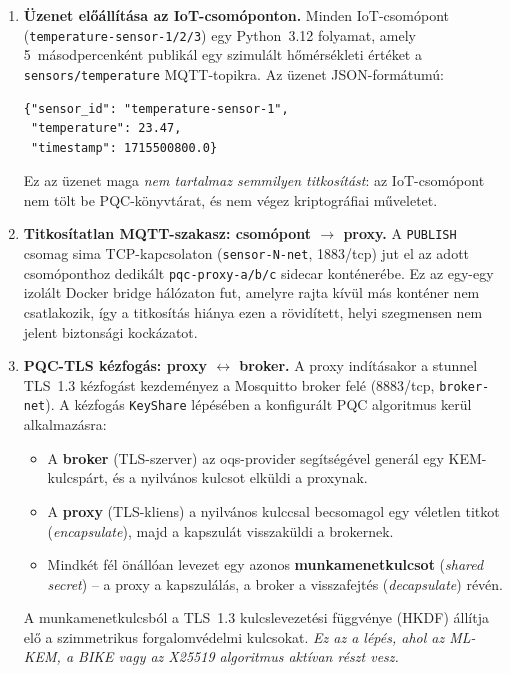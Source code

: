 \begin{enumerate}

    \item \textbf{Üzenet előállítása az IoT-csomóponton.}
    Minden IoT-csomópont (\texttt{temperature-sensor-1/2/3}) egy Python~3.12
    folyamat, amely 5~másodpercenként publikál egy szimulált hőmérsékleti értéket
    a \texttt{sensors/temperature} MQTT-topikra. Az üzenet JSON-formátumú:
\begin{verbatim}
{"sensor_id": "temperature-sensor-1",
 "temperature": 23.47,
 "timestamp": 1715500800.0}
\end{verbatim}
    Ez az üzenet maga \emph{nem tartalmaz semmilyen titkosítást}: az IoT-csomópont
    nem tölt be PQC-könyvtárat, és nem végez kriptográfiai műveletet.

    \item \textbf{Titkosítatlan MQTT-szakasz: csomópont $\to$ proxy.}
    A \texttt{PUBLISH} csomag sima TCP-kapcsolaton (\texttt{sensor-N-net}, 1883/tcp)
    jut el az adott csomóponthoz dedikált \texttt{pqc-proxy-a/b/c} sidecar
    konténerébe. Ez az egy-egy izolált Docker bridge hálózaton fut, amelyre rajta
    kívül más konténer nem csatlakozik, így a titkosítás hiánya ezen a rövidített,
    helyi szegmensen nem jelent biztonsági kockázatot.

    \item \textbf{PQC-TLS kézfogás: proxy $\leftrightarrow$ broker.}
    A proxy indításakor a stunnel TLS~1.3 kézfogást kezdeményez a Mosquitto broker
    felé (8883/tcp, \texttt{broker-net}). A kézfogás \texttt{KeyShare} lépésében a
    konfigurált PQC algoritmus kerül alkalmazásra:
    \begin{itemize}
        \item A \textbf{broker} (TLS-szerver) az oqs-provider segítségével generál
              egy KEM-kulcspárt, és a nyilvános kulcsot elküldi a proxynak.
        \item A \textbf{proxy} (TLS-kliens) a nyilvános kulccsal becsomagol egy
              véletlen titkot (\emph{encapsulate}), majd a kapszulát visszaküldi a
              brokernek.
        \item Mindkét fél önállóan levezet egy azonos \textbf{munkamenetkulcsot}
              (\emph{shared secret}) -- a proxy a kapszulálás, a broker a
              visszafejtés (\emph{decapsulate}) révén.
    \end{itemize}
    A munkamenetkulcsból a TLS~1.3 kulcslevezetési függvénye (HKDF) állítja elő a
    szimmetrikus forgalomvédelmi kulcsokat. \emph{Ez az a lépés, ahol az ML-KEM,
    a BIKE vagy az X25519 algoritmus aktívan részt vesz.}


\end{enumerate}
